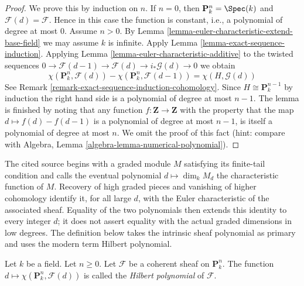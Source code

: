 \begin{proof}
We prove this by induction on $n$. If $n = 0$, then
$\mathbf{P}^n_k = \Spec(k)$ and $\mathcal{F}(d) = \mathcal{F}$.
Hence in this case the function is constant, i.e., a polynomial
of degree at most $0$. Assume $n > 0$. By
Lemma \ref{lemma-euler-characteristic-extend-base-field}
we may assume $k$ is infinite. Apply
Lemma \ref{lemma-exact-sequence-induction}.
Applying Lemma \ref{lemma-euler-characteristic-additive}
to the twisted sequences
$0 \to \mathcal{F}(d - 1) \to \mathcal{F}(d) \to i_*\mathcal{G}(d) \to 0$
we obtain
$$
\chi(\mathbf{P}^n_k, \mathcal{F}(d)) -
\chi(\mathbf{P}^n_k, \mathcal{F}(d - 1)) =
\chi(H, \mathcal{G}(d))
$$
See Remark \ref{remark-exact-sequence-induction-cohomology}.
Since $H \cong \mathbf{P}^{n - 1}_k$
by induction the right hand side is a polynomial of degree at most $n - 1$.
The lemma is finished by noting that any function
$f : \mathbf{Z} \to \mathbf{Z}$ with the property that the map
$d \mapsto f(d) - f(d - 1)$ is a polynomial of degree at most $n - 1$,
is itself a polynomial of degree at most $n$.
We omit the proof of this fact (hint: compare with
Algebra, Lemma \ref{algebra-lemma-numerical-polynomial}).
\end{proof}

\begin{definition}
\label{definition-hilbert-polynomial}
\begin{reference}
\cite[Chapter III, \S 6, no. 80, Proposition 4 and the definition of the
characteristic function, pp. 275--276]{FAC}
\end{reference}
\begin{history}
The cited source begins with a graded module $M$ satisfying its finite-tail
condition and calls the eventual polynomial $d \mapsto \dim_k M_d$ the
characteristic function of $M$. Recovery of high graded pieces and vanishing
of higher cohomology identify it, for all large $d$, with the Euler
characteristic of the associated sheaf. Equality of the two polynomials then
extends this identity to every integer $d$; it does not assert equality with
the actual graded dimensions in low degrees. The definition below takes the
intrinsic sheaf polynomial as primary and uses the modern term Hilbert
polynomial.
\end{history}
Let $k$ be a field. Let $n \geq 0$. Let $\mathcal{F}$ be a coherent sheaf
on $\mathbf{P}^n_k$. The function
$d \mapsto \chi(\mathbf{P}^n_k, \mathcal{F}(d))$ is called the
{\it Hilbert polynomial} of $\mathcal{F}$.
\end{definition}

